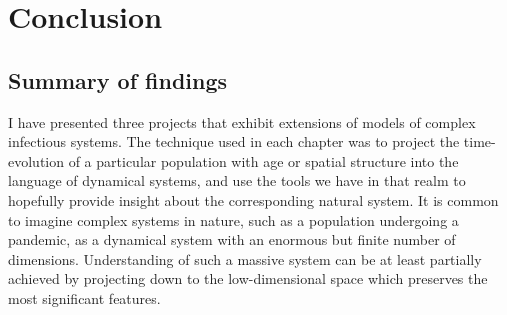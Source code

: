 
\chapter{Conclusion}

\section{Summary of findings}

I have presented three projects that exhibit extensions of models of complex infectious systems. The technique used in each chapter was to project the time-evolution of a particular population with age or spatial structure into the language of dynamical systems, and use the tools we have in that realm to hopefully provide insight about the corresponding natural system. It is common to imagine complex systems in nature, such as a population undergoing a pandemic, as a dynamical system with an enormous but finite number of dimensions. Understanding of such a massive system can be at least partially achieved by projecting down to the low-dimensional space which preserves the most significant features. 

